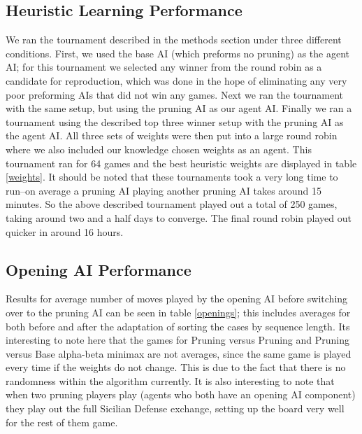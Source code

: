 \documentclass[letterpaper]{article}
\begin{document}
\subsection{Heuristic Learning Performance}
We ran the tournament described in the methods section under three different conditions.  First, we used the base AI (which preforms no pruning) as the agent AI; for this tournament we selected any winner from the round robin as a candidate for reproduction, which was done in the hope of eliminating any very poor preforming AIs that did not win any games. Next we ran the tournament with the same setup, but using the pruning AI as our agent AI. Finally we ran a tournament using the described top three winner setup with the pruning AI as the agent AI. All three sets of weights were then put into a large round robin where we also included our knowledge chosen weights as an agent. This tournament ran for 64 games and the best heuristic weights are displayed in table \ref{weights}. It should be noted that these tournaments took a very long time to run--on average a pruning AI playing another pruning AI takes around 15 minutes. So the above described tournament played out a total of 250 games, taking around two and a half days to converge. The final round robin played out quicker in around 16 hours.

\subsection{Opening AI Performance}
Results for average number of moves played by the opening AI before switching over to the pruning AI can be seen in table \ref{openings}; this includes averages for both before and after the adaptation of sorting the cases by sequence length. Its interesting to note here that the games for Pruning versus Pruning and Pruning versus Base alpha-beta minimax are not averages, since the same game is played every time if the weights do not change.  This is due to the fact that there is no randomness within the algorithm currently. It is also interesting to note that when two pruning players play (agents who both have an opening AI component) they play out the full Sicilian Defense exchange, setting up the board very well for the rest of them game. 
\end{document}
